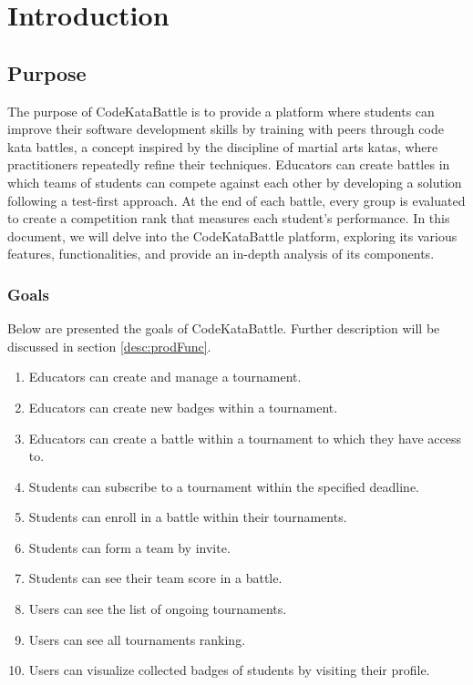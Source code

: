 \chapter{Introduction}

\section{Purpose}
The purpose of CodeKataBattle is to provide a platform where students can improve their software development skills by training with peers through code kata battles, a concept inspired by the discipline of martial arts katas, where practitioners repeatedly refine their techniques.
Educators can create battles in which teams of students can compete against each other by developing a solution following a test-first approach.
At the end of each battle, every group is evaluated to create a competition rank that measures each student's performance.
In this document, we will delve into the CodeKataBattle platform, exploring its various features, functionalities, and provide an in-depth analysis of its components.


\subsection{Goals}
Below are presented the goals of CodeKataBattle. Further description will be discussed in section \ref{desc:prodFunc}.
\begin{enumerate}[label=\textbf{G.\arabic*}]
	\item {} {Educators can create and manage a tournament.}
        \item {} {Educators can create new badges within a tournament.}
        \item {} {Educators can create a battle within a tournament to which they have access to.}
        \item {} {Students can subscribe to a tournament within the specified deadline.}
        \item {} {Students can enroll in a battle within their tournaments.}
        \item {} {Students can form a team by invite.}
        \item {} {Students can see their team score in a battle.}
        \item {} {Users can see the list of ongoing tournaments.}
        \item {} {Users can see all tournaments ranking.}
        \item {} {Users can visualize collected badges of students by visiting their profile.}
\end{enumerate}

